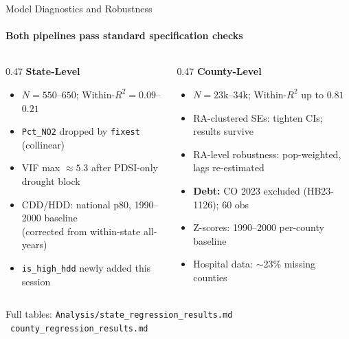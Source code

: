 \documentclass[aspectratio=169,11pt]{beamer}
\newcommand{\tealtext}[1]{{\color{Teal}#1}}
\newcommand{\graytext}[1]{{\color{WarmGray}#1}}
\begin{document}
\begin{frame}{Model Diagnostics and Robustness}
  \framesubtitle{Both pipelines pass standard specification checks}
  \begin{columns}[T]
    \begin{column}{0.47\textwidth}
      \textbf{\tealtext{State-Level}}
      \begin{itemize}\itemsep0.22em
        \item $N = 550$--$650$; Within-$R^2 = 0.09$--$0.21$
        \item \texttt{Pct\_NO2} dropped by \texttt{fixest} (collinear)
        \item VIF max $\approx 5.3$ after PDSI-only drought block
        \item CDD/HDD: national p80, 1990--2000 baseline\\(corrected from within-state all-years)
        \item \texttt{is\_high\_hdd} newly added this session
      \end{itemize}
    \end{column}
    \begin{column}{0.47\textwidth}
      \textbf{\tealtext{County-Level}}
      \begin{itemize}\itemsep0.22em
        \item $N = 23$k--$34$k; Within-$R^2$ up to $0.81$
        \item RA-clustered SEs: tighten CIs; results survive
        \item RA-level robustness: pop-weighted, lags re-estimated
        \item \textbf{Debt:} CO 2023 excluded (HB23-1126); 60 obs
        \item Z-scores: 1990--2000 per-county baseline
        \item Hospital data: $\sim$23\% missing counties
      \end{itemize}
    \end{column}
  \end{columns}
  \vspace{0.4em}
  \begin{center}
    \graytext{\small Full tables: \texttt{Analysis/state\_regression\_results.md} \textbar\ \texttt{county\_regression\_results.md}}
  \end{center}
\end{frame}
\end{document}
